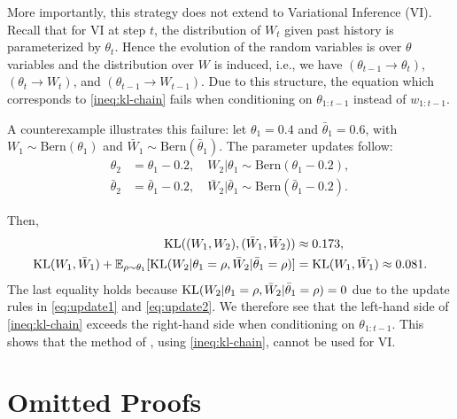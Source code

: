 More importantly, 
this strategy does not extend to Variational Inference (VI). 
Recall that for VI at step $t$, the distribution of $W_t$ given past history is parameterized by $\theta_t$.
Hence the evolution of the random variables is over $\theta$ variables and the distribution over $W$ is induced,
i.e., we have 
$(\theta_{t-1}\rightarrow \theta_t)$, $(\theta_{t}\rightarrow W_{t})$, and $(\theta_{t-1}\rightarrow W_{t-1})$.
Due to this structure, the equation which corresponds to 
\cref{ineq:kl-chain} fails when conditioning on $\theta_{1:{t-1}}$ instead of $w_{1:t-1}$.

A counterexample illustrates this failure: let $\theta_1 = 0.4$ and $\bar{\theta}_1 = 0.6$, with $W_1 \sim \text{Bern}(\theta_1)$ and $\bar{W}_1 \sim \text{Bern}(\bar{\theta}_1)$. The parameter updates follow:
\begin{align}
    \theta_2 &= \theta_1 - 0.2, \quad W_2 | \theta_1 \sim \text{Bern}(\theta_1 - 0.2), \label{eq:update1} \\
    \bar{\theta}_2 &= \bar{\theta}_1 - 0.2, \quad \bar{W}_2 | \bar{\theta}_1 \sim \text{Bern}(\bar{\theta}_1 - 0.2). \label{eq:update2}
\end{align}

Then,
\begin{align}
    \text{KL}((W_1, W_2), (\bar{W}_1, \bar{W}_2)) &\approx 0.173, \\
    \text{KL}(W_1, \bar{W}_1) + \mathbb{E}_{\rho \sim \theta_1}[\text{KL}(W_2 | \theta_1 = \rho, \bar{W}_2 | \bar{\theta}_1 = \rho)] &= \text{KL}(W_1, \bar{W}_1) \approx 0.081.
\end{align}
The last equality holds because
$\text{KL}(W_2 | \theta_1 = \rho, \bar{W}_2 | \bar{\theta}_1 = \rho) = 0$ due to the update rules in \cref{eq:update1} and \cref{eq:update2}.
We therefore see that the left-hand side of \cref{ineq:kl-chain} exceeds the right-hand side when conditioning on $\theta_{1:{t-1}}$. This shows that the method of \citet{Li}, using \cref{ineq:kl-chain}, cannot be used for VI.

\section{Omitted Proofs}



